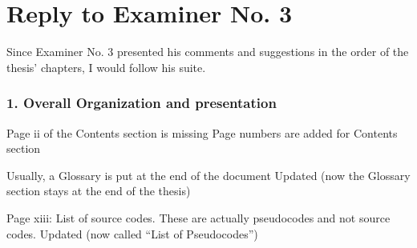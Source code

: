 \section*{Reply to Examiner No. 3}

\begin{replyheader}
\end{replyheader}  

Since Examiner No. 3 presented his comments and suggestions in the order of the thesis' chapters, 
  I would follow his suite.

\subsubsection*{1. Overall Organization and presentation}

\replyToComment
    {Page ii of the Contents section is missing}
    {Page numbers are added for Contents section}

\replyToComment
    {Usually, a Glossary is put at the end of the document}
    {Updated (now the Glossary section stays at the end of the thesis)}

\replyToComment
    {Page xiii: List of source codes. These are actually pseudocodes and not source codes.}
    {Updated (now called ``List of Pseudocodes'')}




